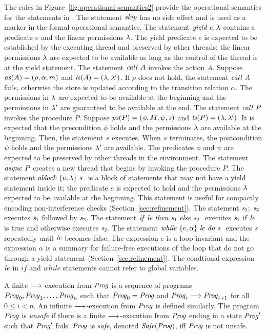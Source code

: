 The rules in Figure~\ref{fig:operational-semantics2} provide the operational semantics for the statements in \civl.
The statement $\mathit{skip}$ has no side effect and is used as a marker in the formal operational semantics.
The statement $\mathit{yield}\ e,\lambda$ contains a predicate $e$ and the linear permissions $\lambda$.
The yield predicate $e$ is expected to be established by the executing thread and preserved by other threads;
the linear permissions $\lambda$ are expected to be available as long as the control of the thread
is at the yield statement.
The statement $\mathit{call}\ A$ invokes the action $A$.
Suppose $\mathit{as}(A) = (\rho, \alpha, m)$ and $\mathit{ls}(A) = (\lambda, \lambda')$.
If $\rho$ does not hold, the statement $\mathit{call}\ A$ fails, 
otherwise the store is updated according to the transition relation $\alpha$.
The permissions in $\lambda$ are expected to be available at the beginning
and the permissions in $\lambda'$ are guaranteed to be available at the end.
The statement $\mathit{call}\ P$ invokes the procedure $P$.
Suppose $\mathit{ps}(P) = (\phi, M, \psi, \mathit{s})$ and $\mathit{ls}(P) = (\lambda, \lambda')$.
It is expected that the precondition $\phi$ holds and the permissions $\lambda$ are available at the beginning.
Then, the statement $\mathit{s}$ executes.
When $\mathit{s}$ terminates, the postcondition $\psi$ holds and the permissions $\lambda'$ are available.
The predicates $\phi$ and $\psi$ are expected to be preserved by other threads in the environment. 
The statement $\mathit{async}\ P$ creates a new thread that begins by invoking the procedure $P$.
The statement $\mathit{ablock}\ {\{e,\lambda\}}\ {\mathit{s}}\ $ is a block of statements that may not have a yield statement inside it;
the predicate $e$ is expected to hold and the permissions $\lambda$ expected to be available at the beginning.
This statement is useful for compactly encoding non-interference checks (Section~\ref{sec:refinement}).
The statement $\mathit{s}_1;\;\mathit{s}_2$ executes $\mathit{s}_1$ followed by $\mathit{s}_2$.
The statement ${\mathit{if}\ {\mathit{le}}\ }{\mathit{then}\ {\mathit{s}_1}\ }{\mathit{else}\ {\mathit{s}_2}\ }$ executes $\mathit{s}_1$ if $\mathit{le}$ is true and otherwise executes $\mathit{s}_2$.
The statement $\mathit{while}\ \{{e,\alpha}\}\ {{\mathit{le}}\ } \mathit{do}\ {{\mathit{s}}\ }$ executes $\mathit{s}$ repeatedly until $\mathit{le}$ becomes false.
The expression $e$ is a loop invariant and the expression $\alpha$ is a summary for failure-free executions of the loop that do not go 
through a yield statement (Section~\ref{sec:refinement}).
The condtional expression $\mathit{le}$ in $\mathit{if}$ and $\mathit{while}$ statements cannot refer to global variables.

A finite $\longrightarrow$-execution from $\mathit{Prog}$ is a sequence of programs $\mathit{Prog}_0,\mathit{Prog}_1,\ldots,\mathit{Prog}_n$ such that $\mathit{Prog}_0 = \mathit{Prog}$ 
and $\mathit{Prog}_i \longrightarrow \mathit{Prog}_{i+1}$ for all $0 \leq i < n$.
An infinite $\longrightarrow$-execution from $\mathit{Prog}$ is defined similarly.
The program $\mathit{Prog}$ is {\em unsafe\/} if there is a finite $\longrightarrow$-execution from $\mathit{Prog}$ ending in a state $\mathit{Prog}'$ 
such that $\mathit{Prog}'$ fails.
$\mathit{Prog}$ is {\em safe}, denoted $\mathit{Safe}(\mathit{Prog})$, iff $\mathit{Prog}$ is not unsafe.

